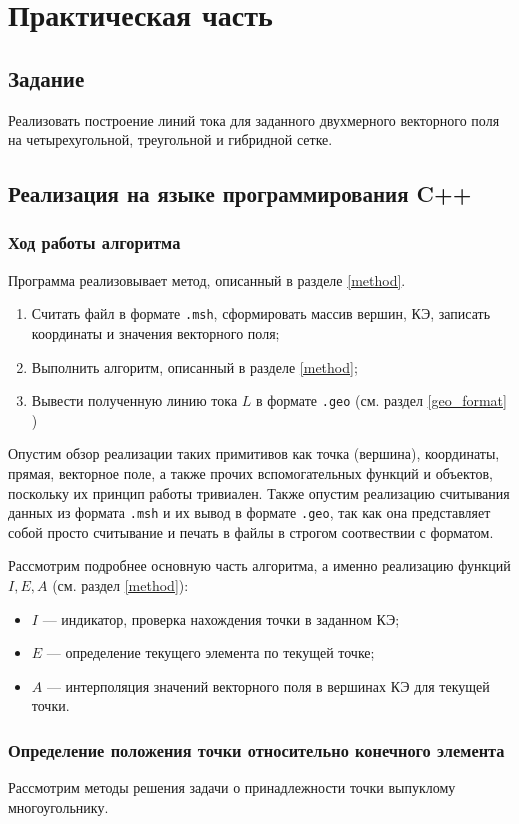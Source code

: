 \chapter{Практическая часть}
\section{Задание}\label{задание}
Реализовать построение линий тока для заданного двухмерного векторного поля на четырехугольной, треугольной и гибридной сетке.

\section{Реализация на языке программирования C++}
\subsection{Ход работы алгоритма}
Программа реализовывает метод, описанный в разделе \ref{method}.
\begin{enumerate}
	\item Считать файл в формате \verb|.msh|, сформировать массив вершин, КЭ, записать координаты и значения векторного поля;
	\item Выполнить алгоритм, описанный в разделе \ref{method};
	\item Вывести полученную линию тока $L$ в формате \verb|.geo| (см. раздел \ref{geo_format} )
\end{enumerate}

Опустим обзор реализации таких примитивов как точка (вершина), координаты, прямая, векторное поле, а также прочих вспомогательных функций и объектов, поскольку их принцип работы тривиален. Также опустим реализацию считывания данных из формата \verb|.msh| и их вывод в формате \verb|.geo|, так как она представляет собой просто считывание и печать в файлы в строгом соотвествии с форматом.

Рассмотрим подробнее основную часть алгоритма, а именно реализацию функций $I, E, A$ (см. раздел \ref{method}):
\begin{itemize}
	\item $I$ --- индикатор, проверка нахождения точки в заданном КЭ;
	\item $E$ --- определение текущего элемента по текущей точке;
	\item $A$ --- интерполяция значений векторного поля в вершинах КЭ для текущей точки.
\end{itemize}
\subsection{Определение положения точки относительно конечного элемента}
Рассмотрим методы решения задачи о принадлежности точки выпуклому многоугольнику.


%

